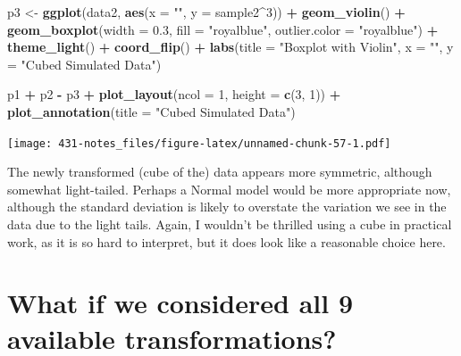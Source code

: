 \documentclass[
]{book}
\newenvironment{Shaded}{\begin{snugshade}}{\end{snugshade}}
\newcommand{\DataTypeTok}[1]{\textcolor[rgb]{0.13,0.29,0.53}{#1}}
\newcommand{\DecValTok}[1]{\textcolor[rgb]{0.00,0.00,0.81}{#1}}
\newcommand{\FloatTok}[1]{\textcolor[rgb]{0.00,0.00,0.81}{#1}}
\newcommand{\KeywordTok}[1]{\textcolor[rgb]{0.13,0.29,0.53}{\textbf{#1}}}
\newcommand{\NormalTok}[1]{#1}
\newcommand{\OperatorTok}[1]{\textcolor[rgb]{0.81,0.36,0.00}{\textbf{#1}}}
\newcommand{\StringTok}[1]{\textcolor[rgb]{0.31,0.60,0.02}{#1}}
\begin{document}
\begin{Shaded}
\begin{Highlighting}[]
\NormalTok{p3 <-}\StringTok{ }\KeywordTok{ggplot}\NormalTok{(data2, }\KeywordTok{aes}\NormalTok{(}\DataTypeTok{x =} \StringTok{""}\NormalTok{, }\DataTypeTok{y =}\NormalTok{ sample2}\OperatorTok{^}\DecValTok{3}\NormalTok{)) }\OperatorTok{+}
\StringTok{    }\KeywordTok{geom_violin}\NormalTok{() }\OperatorTok{+}
\StringTok{    }\KeywordTok{geom_boxplot}\NormalTok{(}\DataTypeTok{width =} \FloatTok{0.3}\NormalTok{, }\DataTypeTok{fill =} \StringTok{"royalblue"}\NormalTok{, }
                 \DataTypeTok{outlier.color =} \StringTok{"royalblue"}\NormalTok{) }\OperatorTok{+}
\StringTok{    }\KeywordTok{theme_light}\NormalTok{() }\OperatorTok{+}
\StringTok{    }\KeywordTok{coord_flip}\NormalTok{() }\OperatorTok{+}
\StringTok{    }\KeywordTok{labs}\NormalTok{(}\DataTypeTok{title =} \StringTok{"Boxplot with Violin"}\NormalTok{,}
         \DataTypeTok{x =} \StringTok{""}\NormalTok{, }\DataTypeTok{y =} \StringTok{"Cubed Simulated Data"}\NormalTok{)}

\NormalTok{p1 }\OperatorTok{+}\StringTok{ }\NormalTok{p2 }\OperatorTok{-}\StringTok{ }\NormalTok{p3 }\OperatorTok{+}\StringTok{ }\KeywordTok{plot_layout}\NormalTok{(}\DataTypeTok{ncol =} \DecValTok{1}\NormalTok{, }\DataTypeTok{height =} \KeywordTok{c}\NormalTok{(}\DecValTok{3}\NormalTok{, }\DecValTok{1}\NormalTok{)) }\OperatorTok{+}
\StringTok{    }\KeywordTok{plot_annotation}\NormalTok{(}\DataTypeTok{title =} \StringTok{"Cubed Simulated Data"}\NormalTok{)}
\end{Highlighting}
\end{Shaded}

\texttt{[image: 431-notes\_files/figure-latex/unnamed-chunk-57-1.pdf]}

The newly transformed (cube of the) data appears more symmetric, although somewhat light-tailed. Perhaps a Normal model would be more appropriate now, although the standard deviation is likely to overstate the variation we see in the data due to the light tails. Again, I wouldn't be thrilled using a cube in practical work, as it is so hard to interpret, but it does look like a reasonable choice here.

\hypertarget{what-if-we-considered-all-9-available-transformations-1}{%
\section{What if we considered all 9 available transformations?}\label{what-if-we-considered-all-9-available-transformations-1}}
\end{document}

